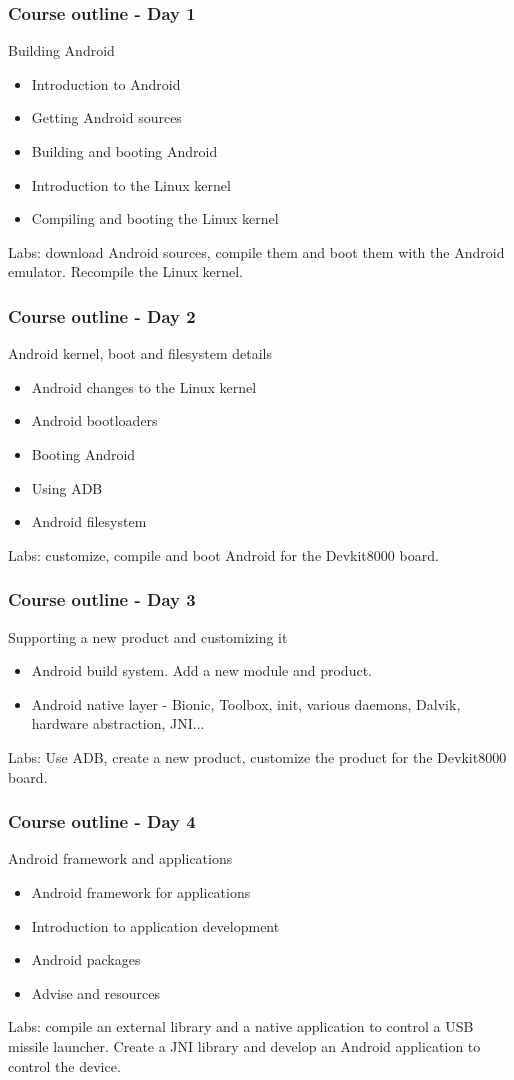 \begin{frame}
\frametitle{Course outline - Day 1}
Building Android
\begin{itemize}
\item Introduction to Android
\item Getting Android sources
\item Building and booting Android
\item Introduction to the Linux kernel 
\item Compiling and booting the Linux kernel 
\end{itemize}
Labs: download Android sources, compile them and boot them with the
Android emulator. Recompile the Linux kernel.
\end{frame}

\begin{frame}
\frametitle{Course outline - Day 2}
Android kernel, boot and filesystem details
\begin{itemize}
\item Android changes to the Linux kernel
\item Android bootloaders
\item Booting Android
\item Using ADB
\item Android filesystem
\end{itemize}
Labs: customize, compile and boot Android for the Devkit8000 board. 
\end{frame}

\begin{frame}
\frametitle{Course outline - Day 3}
Supporting a new product and customizing it
\begin{itemize}
\item Android build system. Add a new module and product.
\item Android native layer - Bionic, Toolbox, init, various daemons,
Dalvik, hardware abstraction, JNI...
\end{itemize}
Labs: Use ADB, create a new product, customize the product for the
Devkit8000 board.
\end{frame}

\begin{frame}
\frametitle{Course outline - Day 4}
Android framework and applications
\begin{itemize}
\item Android framework for applications
\item Introduction to application development
\item Android packages
\item Advise and resources
\end{itemize}
Labs: compile an external library and a native application to control a
USB missile launcher. Create a JNI library and develop an Android
application to control the device.
\end{frame}
